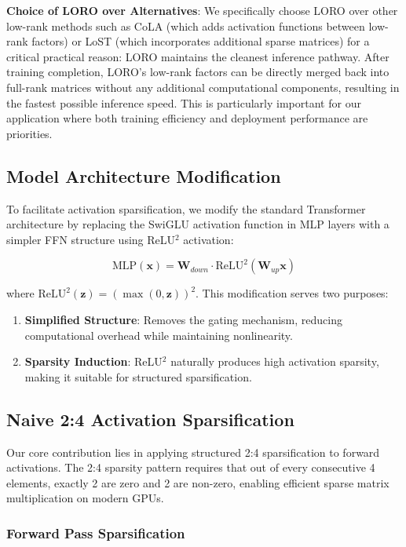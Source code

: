 \textbf{Choice of LORO over Alternatives}: We specifically choose LORO over other low-rank methods such as CoLA (which adds activation functions between low-rank factors) or LoST (which incorporates additional sparse matrices) for a critical practical reason: LORO maintains the cleanest inference pathway. After training completion, LORO's low-rank factors can be directly merged back into full-rank matrices without any additional computational components, resulting in the fastest possible inference speed. This is particularly important for our application where both training efficiency and deployment performance are priorities.

\subsection{Model Architecture Modification}

To facilitate activation sparsification, we modify the standard Transformer architecture by replacing the SwiGLU activation function in MLP layers with a simpler FFN structure using ReLU$^2$ activation:

\begin{equation}
\text{MLP}(\mathbf{x}) = \mathbf{W}_{down} \cdot \text{ReLU}^2(\mathbf{W}_{up} \mathbf{x})
\end{equation}

where $\text{ReLU}^2(\mathbf{z}) = (\max(0, \mathbf{z}))^2$. This modification serves two purposes:
\begin{enumerate}
\item \textbf{Simplified Structure}: Removes the gating mechanism, reducing computational overhead while maintaining nonlinearity.
\item \textbf{Sparsity Induction}: ReLU$^2$ naturally produces high activation sparsity, making it suitable for structured sparsification.
\end{enumerate}

\subsection{Naive 2:4 Activation Sparsification}

Our core contribution lies in applying structured 2:4 sparsification to forward activations. The 2:4 sparsity pattern requires that out of every consecutive 4 elements, exactly 2 are zero and 2 are non-zero, enabling efficient sparse matrix multiplication on modern GPUs.

\subsubsection{Forward Pass Sparsification}

